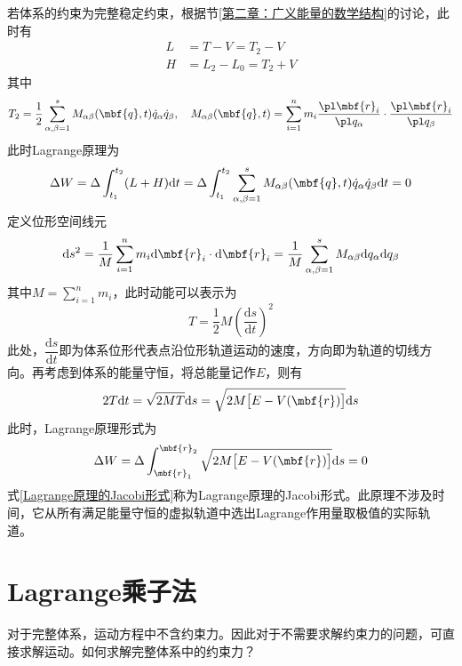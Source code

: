 若体系的约束为完整稳定约束，根据节\ref{第二章：广义能量的数学结构}的讨论，此时有
\begin{align*}
	L & = T-V = T_2 - V \\
	H & = L_2 - L_0 = T_2 + V
\end{align*}
其中
\begin{equation*}
	T_2 = \frac12 \sum_{\alpha,\beta=1}^s M_{\alpha\beta}(\mbf{q},t) \dot{q}_\alpha \dot{q}_\beta,\quad M_{\alpha\beta}(\mbf{q},t) = \sum_{i=1}^n m_i \frac{\pl \mbf{r}_i}{\pl q_\alpha} \cdot \frac{\pl \mbf{r}_i}{\pl q_\beta}
\end{equation*}
此时Lagrange原理为
\begin{equation*}
	\Delta W = \Delta \int_{t_1}^{t_2} (L+H) \mathrm{d} t = \Delta \int_{t_1}^{t_2} \sum_{\alpha,\beta=1}^s M_{\alpha\beta}(\mbf{q},t) \dot{q}_\alpha \dot{q}_\beta \mathrm{d} t = 0
\end{equation*}
定义位形空间线元
\begin{equation*}
	\mathrm{d} s^2 = \frac{1}{M} \sum_{i=1}^n m_i \mathrm{d} \mbf{r}_i \cdot \mathrm{d} \mbf{r}_i = \frac{1}{M} \sum_{\alpha,\beta=1}^s M_{\alpha\beta} \mathrm{d} q_\alpha \mathrm{d} q_\beta
\end{equation*}
其中$\displaystyle M = \sum_{i=1}^n m_i$，此时动能可以表示为
\begin{equation*}
	T = \frac12 M \left(\frac{\mathrm{d} s}{\mathrm{d} t}\right)^2 
\end{equation*}
此处，$\dfrac{\mathrm{d} s}{\mathrm{d} t}$即为体系位形代表点沿位形轨道运动的速度，方向即为轨道的切线方向。再考虑到体系的能量守恒，将总能量记作$E$，则有
\begin{equation*}
	2T\mathrm{d} t = \sqrt{2MT}\mathrm{d} s = \sqrt{2M\big[E-V(\mbf{r})\big]} \mathrm{d}s
\end{equation*}
此时，Lagrange原理形式为
\begin{equation}
	\Delta W = \Delta \int_{\mbf{r}_1}^{\mbf{r}_2} \sqrt{2M\big[E-V(\mbf{r})\big]} \mathrm{d}s = 0
	\label{Lagrange原理的Jacobi形式}
\end{equation}
式\eqref{Lagrange原理的Jacobi形式}称为{\heiti Lagrange原理的Jacobi形式}。此原理不涉及时间，它从所有满足能量守恒的虚拟轨道中选出Lagrange作用量取极值的实际轨道。

\section{Lagrange乘子法}

对于完整体系，运动方程中不含约束力。因此对于不需要求解约束力的问题，可直接求解运动。如何求解完整体系中的约束力？

